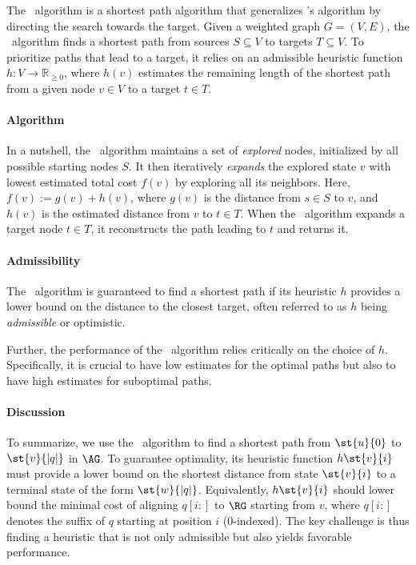 
%
The \A~algorithm is a shortest path algorithm that generalizes \dijkstra's
algorithm by directing the search towards the target.
Given a weighted graph $G=(V,E)$, the \A~algorithm finds a shortest path from
sources $S \subseteq V$ to targets $T \subseteq V$.
%
To prioritize paths that lead to a target, it relies on an admissible heuristic
function $h \colon V \to \mathbb{R}_{\geq 0}$, where $h(v)$ estimates the
remaining length of the shortest path from a given node $v \in V$ to a target
$t \in T$.


\paragraph{Algorithm}
% 
In a nutshell, the \A~algorithm maintains a set of \emph{explored} nodes,
initialized by all possible starting nodes $S$. It then iteratively
\emph{expands} the explored state $v$ with lowest estimated total cost $f(v)$ by
exploring all its neighbors. Here, $f(v) := g(v) + h(v)$, where $g(v)$ is the
distance from $s \in S$ to $v$, and $h(v)$ is the estimated distance from $v$ to
$t \in T$.
%
When the \A~algorithm expands a target node $t \in T$, it reconstructs the path
leading to $t$ and returns it.
%
\paragraph{Admissibility}
%
The \A~algorithm is guaranteed to find a shortest path if its heuristic $h$
provides a lower bound on the distance to the closest target, often referred to
as $h$ being \emph{admissible} or optimistic.

Further, the performance of the \A~algorithm relies critically on the choice of
$h$. Specifically, it is crucial to have low estimates for the optimal paths but
also to have high estimates for suboptimal paths.

\paragraph{Discussion}
%
To summarize, we use the \A~algorithm to find a shortest path from $\st{u}{0}$
to $\st{v}{|q|}$ in $\AG$. To guarantee optimality, its heuristic function
$h\st{v}{i}$ must provide a lower bound on the shortest distance from state
$\st{v}{i}$ to a terminal state of the form $\st{w}{\lvert q \rvert}$.
%
Equivalently, $h\st{v}{i}$ should lower bound the minimal cost of aligning
$q[i{:}]$ to $\RG$ starting from $v$, where $q[i{:}]$ denotes the suffix of $q$
starting at position $i$ ($0$-indexed).
%
The key challenge is thus finding a heuristic that is not only admissible but
also yields favorable performance.

